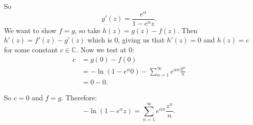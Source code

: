 \documentclass{article}
\begin{document}
\begin{enumerate}
\begin{enumerate}[label= (\alph*)]
    So
    \[
    g'(z)=\frac{e^{\alpha }}{1-e^{\alpha}z}
    .\] 
    We want to show $f=g$, so take $h(z)=g(z)-f(z)$. Then $h'(z)=f'(z)-g'(z)$ which is 0, giving us that $h'(z)=0$ and $h(z)=c$ for some constant $c\in \mathbb{C}$. Now we test at $0$:
    \begin{align*}
        c&= g(0)-f(0) \\
         &= -\ln(1-e^{\alpha}0)-\sum_{n=1}^{\infty} e^{\alpha n}\frac{0^{n}}{n}\\
         &= 0-0
    .\end{align*}

    So $c=0$ and $f=g$.
    Therefore:
    \[
         -\ln(1-e^{\alpha}z)=\sum_{n=1}^{\infty} e^{\alpha n}\frac{z^{n}}{n}
    .\] 
\end{enumerate}
\end{enumerate}
\end{document}
